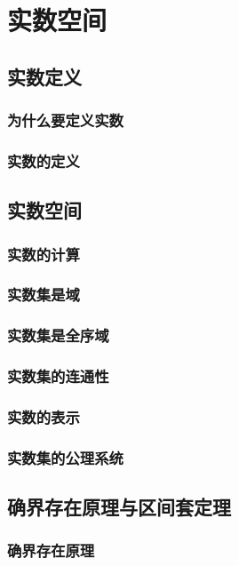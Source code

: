 

\chapter{实数空间}\label{ch:9}
\section{实数定义}
\subsection{为什么要定义实数}
\subsection{实数的定义}
\section{实数空间}
\subsection{实数的计算}
\subsection{实数集是域}
\subsection{实数集是全序域}
\subsection{实数集的连通性}
\subsection{实数的表示}
\subsection{实数集的公理系统}
\begin{exercise}
\item
\end{exercise}
\section{确界存在原理与区间套定理}
\subsection{确界存在原理}

